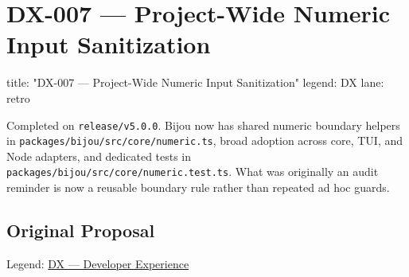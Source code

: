 \chapter{DX-007 --- Project-Wide Numeric Input Sanitization}\label{record-309}

\smallskip

\begin{RecordMeta}
title: "DX-007 — Project-Wide Numeric Input Sanitization"
legend: DX
lane: retro

\end{RecordMeta}

Completed on \texttt{r\allowbreak{}e\allowbreak{}l\allowbreak{}e\allowbreak{}a\allowbreak{}s\allowbreak{}e\allowbreak{}/\allowbreak{}v\allowbreak{}5\allowbreak{}.\allowbreak{}0\allowbreak{}.\allowbreak{}0}. Bijou now has shared numeric boundary helpers in \texttt{p\allowbreak{}a\allowbreak{}c\allowbreak{}k\allowbreak{}a\allowbreak{}g\allowbreak{}e\allowbreak{}s\allowbreak{}/\allowbreak{}b\allowbreak{}i\allowbreak{}j\allowbreak{}o\allowbreak{}u\allowbreak{}/\allowbreak{}s\allowbreak{}r\allowbreak{}c\allowbreak{}/\allowbreak{}c\allowbreak{}o\allowbreak{}r\allowbreak{}e\allowbreak{}/\allowbreak{}n\allowbreak{}u\allowbreak{}m\allowbreak{}e\allowbreak{}r\allowbreak{}i\allowbreak{}c\allowbreak{}.\allowbreak{}t\allowbreak{}s}, broad adoption across core, TUI, and Node adapters, and dedicated tests in \texttt{p\allowbreak{}a\allowbreak{}c\allowbreak{}k\allowbreak{}a\allowbreak{}g\allowbreak{}e\allowbreak{}s\allowbreak{}/\allowbreak{}b\allowbreak{}i\allowbreak{}j\allowbreak{}o\allowbreak{}u\allowbreak{}/\allowbreak{}s\allowbreak{}r\allowbreak{}c\allowbreak{}/\allowbreak{}c\allowbreak{}o\allowbreak{}r\allowbreak{}e\allowbreak{}/\allowbreak{}n\allowbreak{}u\allowbreak{}m\allowbreak{}e\allowbreak{}r\allowbreak{}i\allowbreak{}c\allowbreak{}.\allowbreak{}t\allowbreak{}e\allowbreak{}s\allowbreak{}t\allowbreak{}.\allowbreak{}t\allowbreak{}s}. What was originally an audit reminder is now a reusable boundary rule rather than repeated ad hoc guards.

\section{Original Proposal}\label{record-309-original-proposal}

Legend: \href{https://github.com/flyingrobots/bijou/blob/1853ad902f6bf219326409e7f743a5a1d6517dbc/docs/method/legends/DX-developer-experience.md}{DX --- Developer Experience}

